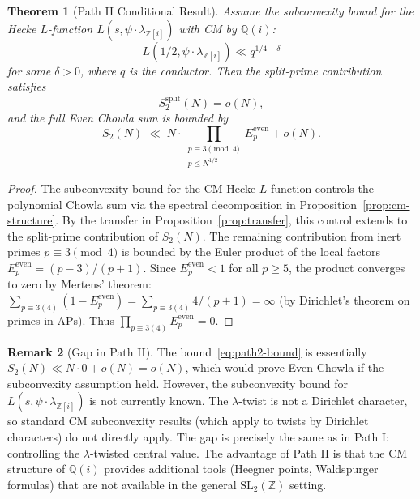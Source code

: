 \documentclass[11pt,a4paper]{article}
\theoremstyle{plain}
\newtheorem{theorem}{Theorem}[section]
\theoremstyle{definition}
\newtheorem{remark}[theorem]{Remark}
\newcommand{\SL}{\mathrm{SL}_2}
\begin{document}
\begin{theorem}[Path II Conditional Result]\label{thm:path2}
Assume the subconvexity bound for the Hecke $L$-function $L(s, \psi \cdot \lambda_{\mathbb{Z}[i]})$ with CM by $\mathbb{Q}(i)$:
\begin{equation}\label{eq:subconvexity-CM}
L(1/2, \psi \cdot \lambda_{\mathbb{Z}[i]}) \ll q^{1/4 - \delta}
\end{equation}
for some $\delta > 0$, where $q$ is the conductor. Then the split-prime contribution satisfies
\[
S_2^{\mathrm{split}}(N) = o(N),
\]
and the full Even Chowla sum is bounded by
\begin{equation}\label{eq:path2-bound}
S_2(N) \;\ll\; N \cdot \prod_{\substack{p \equiv 3 \pmod{4} \\ p \leq N^{1/2}}} E_p^{\mathrm{even}} + o(N).
\end{equation}
\end{theorem}

\begin{proof}
The subconvexity bound for the CM Hecke $L$-function controls the polynomial Chowla sum via the spectral decomposition in Proposition~\ref{prop:cm-structure}. By the transfer in Proposition~\ref{prop:transfer}, this control extends to the split-prime contribution of $S_2(N)$. The remaining contribution from inert primes $p \equiv 3 \pmod{4}$ is bounded by the Euler product of the local factors $E_p^{\mathrm{even}} = (p-3)/(p+1)$. Since $E_p^{\mathrm{even}} < 1$ for all $p \geq 5$, the product converges to zero by Mertens' theorem: $\sum_{p \equiv 3(4)} (1 - E_p^{\mathrm{even}}) = \sum_{p \equiv 3(4)} 4/(p+1) = \infty$ (by Dirichlet's theorem on primes in APs). Thus $\prod_{p \equiv 3(4)} E_p^{\mathrm{even}} = 0$.
\end{proof}

\begin{remark}[Gap in Path II]
The bound~\eqref{eq:path2-bound} is essentially $S_2(N) \ll N \cdot 0 + o(N) = o(N)$, which would prove Even Chowla if the subconvexity assumption held. However, the subconvexity bound for $L(s, \psi \cdot \lambda_{\mathbb{Z}[i]})$ is not currently known. The $\lambda$-twist is not a Dirichlet character, so standard CM subconvexity results (which apply to twists by Dirichlet characters) do not directly apply. The gap is precisely the same as in Path I: controlling the $\lambda$-twisted central value. The advantage of Path II is that the CM structure of $\mathbb{Q}(i)$ provides additional tools (Heegner points, Waldspurger formulas) that are not available in the general $\SL(\mathbb{Z})$ setting.
\end{remark}
\end{document}
